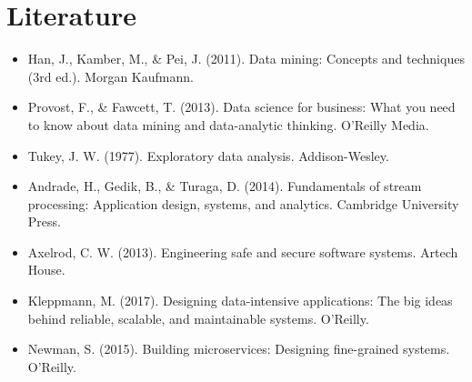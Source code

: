 \section{Literature}
\begin{itemize}
    \item Han, J., Kamber, M., \& Pei, J. (2011). Data mining: Concepts and techniques (3rd ed.). Morgan Kaufmann.
    \item Provost, F., \& Fawcett, T. (2013). Data science for business: What you need to know about data mining and data-analytic thinking. O'Reilly Media.
    \item Tukey, J. W. (1977). Exploratory data analysis. Addison-Wesley.
    \item Andrade, H., Gedik, B., \& Turaga, D. (2014). Fundamentals of stream processing: Application
          design, systems, and analytics. Cambridge University Press.
    \item Axelrod, C. W. (2013). Engineering safe and secure software systems. Artech House.
    \item Kleppmann, M. (2017). Designing data-intensive applications: The big ideas behind reliable,
          scalable, and maintainable systems. O'Reilly.
    \item Newman, S. (2015). Building microservices: Designing fine-grained systems. O'Reilly.
\end{itemize}
